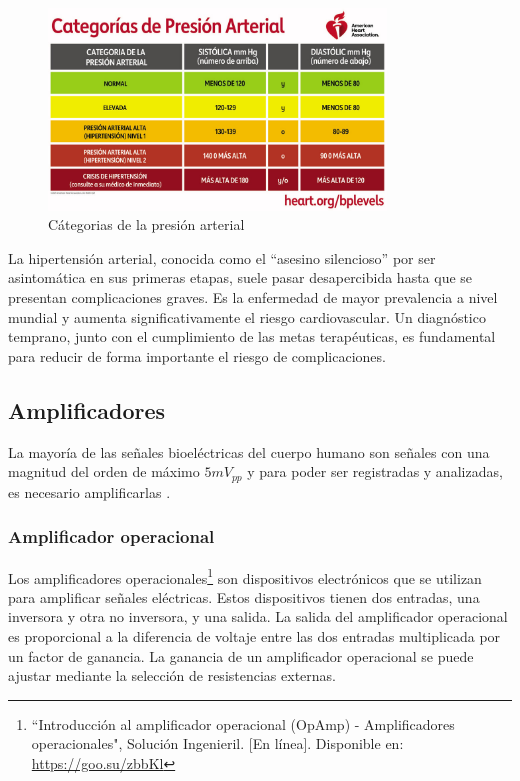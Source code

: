     \begin{figure}[H]
        \centering
        \includegraphics[width=0.8\textwidth]{img/Marco/PA_categoria.jpg}
        \caption[Cátegorias de la presión arterial]{Cátegorias de la presión arterial\footnotemark}
        \label{fig:PA_categoria}
    \end{figure}

    La hipertensión arterial, conocida como el ``asesino silencioso'' por ser asintomática en sus primeras etapas, suele pasar desapercibida hasta que se presentan complicaciones graves. Es la enfermedad de mayor prevalencia a nivel mundial y aumenta significativamente el riesgo cardiovascular. Un diagnóstico temprano, junto con el cumplimiento de las metas terapéuticas, es fundamental para reducir de forma importante el riesgo de complicaciones.

    \subsection{Amplificadores}
    La mayoría de las señales bioeléctricas del cuerpo humano son señales con una magnitud del orden de máximo $5 mV_{pp}$ y para poder ser registradas y analizadas, es necesario amplificarlas \cite{Diaz_amplificacion_señales}.

        \subsubsection{Amplificador operacional}
            Los amplificadores operacionales\footnote{``Introducción al amplificador operacional (OpAmp) - Amplificadores operacionales", Solución Ingenieril. [En línea]. Disponible en: \url{https://goo.su/zbbKl}} son dispositivos electrónicos que se utilizan para amplificar señales eléctricas. Estos dispositivos tienen dos entradas, una inversora y otra no inversora, y una salida. La salida del amplificador operacional es proporcional a la diferencia de voltaje entre las dos entradas multiplicada por un factor de ganancia. La ganancia de un amplificador operacional se puede ajustar mediante la selección de resistencias externas.

